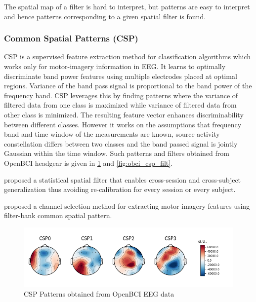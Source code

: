 The spatial map of a filter is hard to interpret, but patterns are easy to interpret and hence patterns corresponding to a given spatial filter is found.

\subsubsection{Common Spatial Patterns (CSP)}
CSP is a supervised feature extraction method for classification algorithms which works only for motor-imagery information in EEG. It learns to optimally discriminate band power features using multiple electrodes placed at optimal regions. Variance of the band pass signal is proportional to the band power of the frequency band. CSP leverages this by finding patterns where the  variance of filtered data from one class is maximized while variance of filtered data from other class is minimized. The resulting feature vector enhances discriminability between different classes. However it works on the assumptions that frequency band and time window of the measurements are known, source activity constellation differs between two classes and the band passed signal is jointly Gaussian within the time window. Such patterns and filters obtained from OpenBCI headgear is given in \ref{fig:obci_csp_pat} and \ref{fig:obci_csp_filt}.

\cite{2022_CSP_RiemGeo_Errp} proposed a statistical spatial filter that enables cross-session and cross-subject generalization thus avoiding re-calibration for every session or every subject. 

\cite{2019_FBCSP_FeatGen} proposed a channel selection method for extracting motor imagery features using filter-bank common spatial pattern.

\begin{figure}[H] 
    \begin{center}
    \includegraphics[width=1.0\textwidth]{images/obci_csp_pat.png}
    \caption{CSP Patterns obtained from OpenBCI EEG data}
    \label{fig:obci_csp_pat}
\end{center}
\end{figure}

